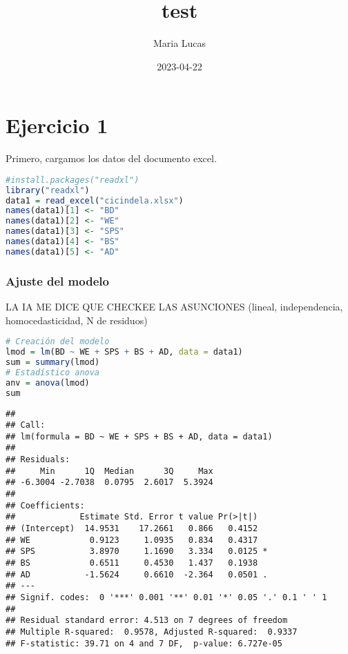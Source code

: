 \documentclass[
]{article}
\title{test}
\author{Maria Lucas}
\date{2023-04-22}
\begin{document}
\maketitle

{
\setcounter{tocdepth}{4}
\tableofcontents
}
\hypertarget{ejercicio-1}{%
\section{Ejercicio 1}\label{ejercicio-1}}

Primero, cargamos los datos del documento excel.

\begin{lstlisting}[language=R]
#install.packages("readxl")
library("readxl")
data1 = read_excel("cicindela.xlsx")
names(data1)[1] <- "BD"
names(data1)[2] <- "WE"
names(data1)[3] <- "SPS"
names(data1)[4] <- "BS"
names(data1)[5] <- "AD"
\end{lstlisting}

\hypertarget{ajuste-del-modelo}{%
\subsubsection{Ajuste del modelo}\label{ajuste-del-modelo}}

LA IA ME DICE QUE CHECKEE LAS ASUNCIONES (lineal, independencia,
homocedasticidad, N de residuos)

\begin{lstlisting}[language=R]
# Creación del modelo
lmod = lm(BD ~ WE + SPS + BS + AD, data = data1)
sum = summary(lmod)
# Estadístico anova
anv = anova(lmod)
sum
\end{lstlisting}

\begin{lstlisting}
## 
## Call:
## lm(formula = BD ~ WE + SPS + BS + AD, data = data1)
## 
## Residuals:
##     Min      1Q  Median      3Q     Max 
## -6.3004 -2.7038  0.0795  2.6017  5.3924 
## 
## Coefficients:
##             Estimate Std. Error t value Pr(>|t|)  
## (Intercept)  14.9531    17.2661   0.866   0.4152  
## WE            0.9123     1.0935   0.834   0.4317  
## SPS           3.8970     1.1690   3.334   0.0125 *
## BS            0.6511     0.4530   1.437   0.1938  
## AD           -1.5624     0.6610  -2.364   0.0501 .
## ---
## Signif. codes:  0 '***' 0.001 '**' 0.01 '*' 0.05 '.' 0.1 ' ' 1
## 
## Residual standard error: 4.513 on 7 degrees of freedom
## Multiple R-squared:  0.9578, Adjusted R-squared:  0.9337 
## F-statistic: 39.71 on 4 and 7 DF,  p-value: 6.727e-05
\end{lstlisting}
\end{document}

